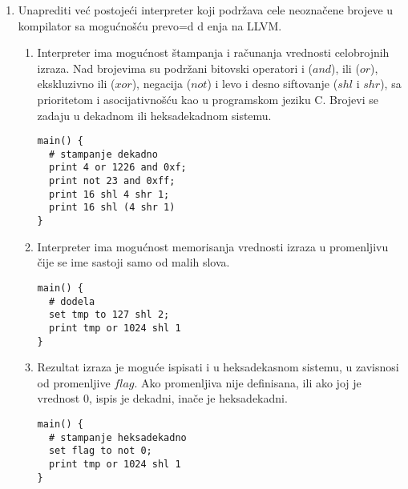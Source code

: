 \documentclass[a4paper]{article}
\def\dj{\leavevmode\setbox0=\hbox{d}\kern0pt
 \rlap{\kern.215em\raise.46\ht0\hbox{-}}d}
\begin{document}
\begin{enumerate}

\item Unaprediti ve\' c postoje\' ci interpreter koji podr\v zava cele
  neozna\v cene brojeve u kompilator sa mogu\' cno\v s\' cu prevo\dj
  enja na LLVM.

\begin{enumerate}

\item Interpreter ima mogu\' cnost \v stampanja i ra\v cunanja
  vrednosti celobrojnih izraza. Nad brojevima su podr\v zani bitovski
  operatori i ($and$), ili ($or$), ekskluzivno ili ($xor$), negacija
  ($not$) i levo i desno siftovanje ($shl$ i $shr$), sa prioritetom i
  asocijativno\v s\' cu kao u programskom jeziku C. Brojevi se zadaju
  u dekadnom ili heksadekadnom sistemu.

\begin{verbatim}
main() {
  # stampanje dekadno
  print 4 or 1226 and 0xf;
  print not 23 and 0xff;
  print 16 shl 4 shr 1;
  print 16 shl (4 shr 1)
}
\end{verbatim}

\item Interpreter ima mogu\' cnost memorisanja vrednosti izraza u
  promenljivu \v cije se ime sastoji samo od malih slova.
\begin{verbatim}
main() {
  # dodela
  set tmp to 127 shl 2;
  print tmp or 1024 shl 1
}
\end{verbatim}

\item Rezultat izraza je mogu\' ce ispisati i u heksadekasnom sistemu,
  u zavisnosi od promenljive $flag$. Ako promenljiva nije definisana,
  ili ako joj je vrednost 0, ispis je dekadni, ina\v ce je
  heksadekadni.

\begin{verbatim}
main() {
  # stampanje heksadekadno
  set flag to not 0;
  print tmp or 1024 shl 1
}
\end{verbatim}

\end{enumerate}

\end{enumerate}
\end{document}
